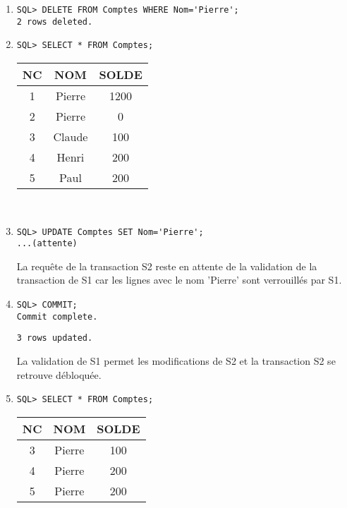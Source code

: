\documentclass{article}
\begin{document}
\begin{enumerate}[label=\arabic*)]
	\item {}
		\begin{lstlisting}
SQL> DELETE FROM Comptes WHERE Nom='Pierre';
2 rows deleted.
		\end{lstlisting}

	\item {}
		\begin{lstlisting}
SQL> SELECT * FROM Comptes;
		\end{lstlisting}

\begin{tabular}{|c|c|c|}
	\hline
        	NC & NOM & SOLDE \\
	\hline        
 	1 & Pierre & 1200 \\
	\hline         
	2 & Pierre & 0 \\
	\hline
	3 & Claude & 100 \\
	\hline
	4 & Henri & 200 \\
	\hline
	5 & Paul & 200 \\
	\hline
\end{tabular} \\

	\item {}
		\begin{lstlisting}
SQL> UPDATE Comptes SET Nom='Pierre';
...(attente)
		\end{lstlisting}
La requête de la transaction S2 reste en attente de la validation de la transaction de S1 car les lignes avec le nom 'Pierre' sont verrouillés par S1.

	\item {}
		\begin{lstlisting}
SQL> COMMIT;
Commit complete.
		\end{lstlisting}

		\begin{lstlisting}
3 rows updated.
		\end{lstlisting}

La validation de S1 permet les modifications de S2 et la transaction S2 se retrouve débloquée.

	\item {}
		\begin{lstlisting}
SQL> SELECT * FROM Comptes;
		\end{lstlisting}

\begin{tabular}{|c|c|c|}
	\hline
        	NC & NOM & SOLDE \\
	\hline        
	3 & Pierre & 100 \\
	\hline
	4 & Pierre & 200 \\
	\hline
	5 & Pierre & 200 \\
	\hline
\end{tabular} \\


\end{enumerate}
\end{document}
